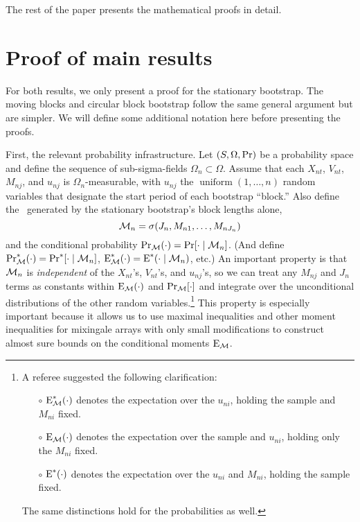 \documentclass[11pt]{article}
\begin{document}
The rest of the paper presents the mathematical proofs in detail.

\appendix
\section{Proof of main results}

For both results, we only present a proof for the stationary
bootstrap. The moving blocks and circular block bootstrap follow the
same general argument but are simpler. We will define some additional
notation here before presenting the proofs.

First, the relevant probability infrastructure.  Let
$(S, \Omega, \operatorname{Pr})$ be a probability space and define the sequence of
sub-sigma-fields $\Omega_n \subset \Omega$. Assume that each
$X_{nt}$, $V_{nt}$, $M_{nj}$, and $u_{nj}$ is $\Omega_n$-measurable,
with $u_{nj}$ the $\operatorname{uniform}(1,\dots,n)$ random variables
that designate the start period of each bootstrap ``block.'' Also
define the \sigmafield\ generated by the stationary bootstrap's block
lengths alone,
\begin{equation}
  \mathcal{M}_n = \sigma(J_{n}, M_{n1},\dots,M_{nJ_n})
\end{equation}
and the conditional probability $\operatorname{Pr}_{\mathcal{M}}(\cdot) = \operatorname{Pr}[\cdot \mid \mathcal{M}_n]$.
(And define $\operatorname{Pr}_{\mathcal{M}}^*(\cdot) = \operatorname{Pr}^*[\cdot \mid \mathcal{M}_n]$, $\operatorname{E}_{\mathcal{M}}^*(\cdot) =
\operatorname{E}^*(\cdot \mid \mathcal{M}_n)$, etc.) An important property is
that $\mathcal{M}_n$ is \emph{independent} of the $X_{nt}$'s, $V_{nt}$'s, and
$u_{nj}$'s, so we can treat any
$M_{nj}$ and $J_n$ terms as constants within $\operatorname{E}_{\mathcal{M}}(\cdot)$ and
$\operatorname{Pr}_{\mathcal{M}}[\cdot]$ and integrate over the unconditional distributions of the
other random variables.\footnote{%
  A referee suggested the following clarification:
  \begin{itemize}
  \item[$\circ$] $\operatorname{E}_{\mathcal{M}}^*(\cdot)$ denotes the expectation over the $u_{ni}$, holding
    the sample and $M_{ni}$ fixed.
  \item[$\circ$] $\operatorname{E}_{\mathcal{M}}(\cdot)$ denotes the expectation over the sample and
    $u_{ni}$, holding only the $M_{ni}$ fixed.
  \item[$\circ$] $\operatorname{E}^*(\cdot)$ denotes the expectation over the $u_{ni}$ and
    $M_{ni}$, holding the sample fixed.
  \end{itemize}
  The same distinctions hold for the probabilities as well.} %
This property is especially important because it allows us to use
maximal inequalities and other moment inequalities for mixingale
arrays with only small modifications to construct almost sure bounds
on the conditional moments $\operatorname{E}_{\mathcal{M}}$.
\end{document}
